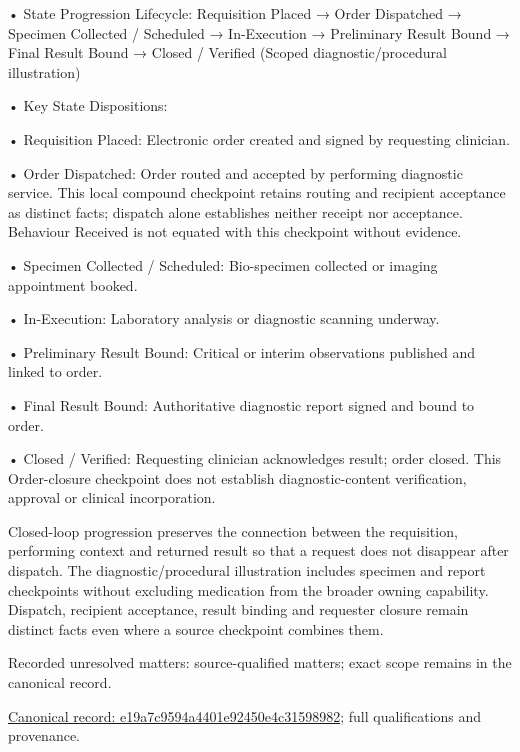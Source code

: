 •
State Progression Lifecycle: Requisition Placed → Order Dispatched → Specimen Collected / Scheduled → In-Execution → Preliminary Result Bound → Final Result Bound → Closed / Verified   (Scoped diagnostic/procedural illustration)



•
Key State Dispositions:



•
Requisition Placed: Electronic order created and signed by requesting clinician.



•
Order Dispatched: Order routed and accepted by performing diagnostic service. This local compound checkpoint retains routing and recipient acceptance as distinct facts; dispatch alone establishes neither receipt nor acceptance. Behaviour Received is not equated with this checkpoint without evidence.



•
Specimen Collected / Scheduled: Bio-specimen collected or imaging appointment booked.



•
In-Execution: Laboratory analysis or diagnostic scanning underway.



•
Preliminary Result Bound: Critical or interim observations published and linked to order.



•
Final Result Bound: Authoritative diagnostic report signed and bound to order.



•
Closed / Verified: Requesting clinician acknowledges result; order closed. This Order-closure checkpoint does not establish diagnostic-content verification, approval or clinical incorporation.



Closed-loop progression preserves the connection between the requisition, performing context and returned result so that a request does not disappear after dispatch. The diagnostic/procedural illustration includes specimen and report checkpoints without excluding medication from the broader owning capability. Dispatch, recipient acceptance, result binding and requester closure remain distinct facts even where a source checkpoint combines them.


{\small Recorded unresolved matters: source-qualified matters; exact scope remains in the canonical record.}\par
{\footnotesize \href{../../../../../../../continuum/business/business-process/e19a7c9594a4401e92450e4c31598982.md}{Canonical record: e19a7c9594a4401e92450e4c31598982}; full qualifications and provenance.}\par
